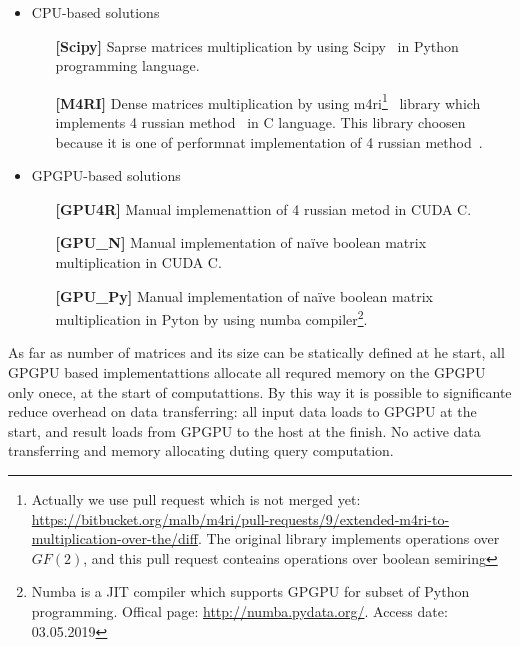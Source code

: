 \begin{itemize}
  \item CPU-based solutions 
  \begin{itemize}
    \item[\textbf{[Scipy]}] Saprse matrices multiplication by using Scipy~\cite{scipy} in Python programming language.
    \item[\textbf{[M4RI]}] Dense matrices multiplication by using m4ri\footnote{Actually we use pull request which is not merged yet: \url{https://bitbucket.org/malb/m4ri/pull-requests/9/extended-m4ri-to-multiplication-over-the/diff}. The original library implements operations over $GF(2)$, and this pull request conteains operations over boolean semiring}~\cite{M4RI} library which implements 4 russian method~\cite{arlazarov1970economical} in C language.
    This library choosen because it is one of performnat implementation of 4 russian method~\cite{albrechtefficient}.
  \end{itemize}
  \item GPGPU-based solutions
  \begin{itemize}
    \item[\textbf{[GPU4R]}] Manual implemenattion of 4 russian metod in CUDA C.
    \item[\textbf{[GPU\_N]}] Manual implementation of na\"ive boolean matrix multiplication in CUDA C.
    \item[\textbf{[GPU\_Py]}] Manual implementation of na\"ive boolean matrix multiplication in Pyton by using numba compiler\footnote{Numba is a JIT compiler which supports GPGPU for subset of Python programming. Offical page: \url{http://numba.pydata.org/}. Access date: 03.05.2019}. 
  \end{itemize}
\end{itemize}

As far as number of matrices and its size can be statically defined at he start, all GPGPU based implementattions allocate all requred memory on the GPGPU only onece, at the start of computattions.
By this way it is possible to significante reduce overhead on data transferring: all input data loads to GPGPU at the start, and result loads from GPGPU to the host at the finish.
No active data transferring and memory allocating duting query computation. 
